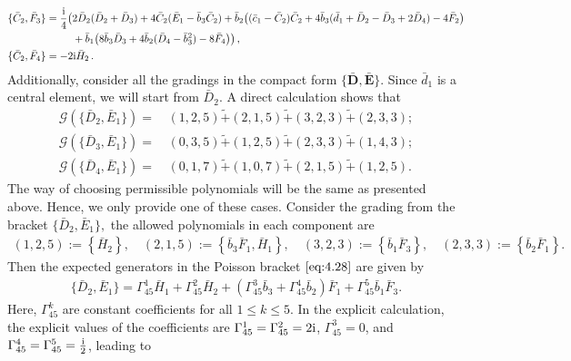 \documentclass[10pt]{amsart}
\theoremstyle{definition}
\theoremstyle{corollary}
\theoremstyle{remark}
\theoremstyle{conclusion}
\begin{document}
\begin{align} 
\{\bar{C}_2, \bar{F}_{3}\}&=\frac{{\rm i}}{4}\bigl( 2\bar{D}_2(\bar{D}_2+\bar{D}_3)+4 \bar{C}_2(\bar{E}_1-\bar{b}_3 \bar{C}_2)+\bar{b}_2\bigl((\bar{c}_1-\bar{C}_2)\bar{C}_2+4 \bar{b}_3(\bar{d}_1+\bar{D}_2-\bar{D}_3+2 \bar{D}_4)-4 \bar{F}_2 \bigl)  \nonumber\\
& \hskip 0.9 cm  +\bar{b}_1\bigl(8 \bar{b}_3 \bar{D}_3+4 \bar{b}_2(\bar{D}_4-\bar{b}_3^2)-8 \bar{F}_4\bigl)\bigl) \, , \nonumber\\
\{\bar{C}_2, \bar{F}_{4}\}&=-2 {\rm i} \bar{H}_2 \, .
\end{align} 
 Additionally, consider all the gradings in the compact form $\{\bar{\textbf{D}},\bar{\textbf{E}}\}$. Since $\bar{d}_1$ is a central element, we will start from $\bar{D}_2.$ A direct calculation shows that \begin{align}
    \mathcal{G} (\{\bar{D}_2,\bar{E}_1\}) = & \, (1,2,5) \tilde{+} (2,1,5) \tilde{+} (3,2,3) \tilde{+} (2,3,3); \label{eq:4.28}\\
    \mathcal{G} (\{\bar{D}_3,\bar{E}_1\}) = & \, (0,3,5) \tilde{+} (1,2,5) \tilde{+} (2,3,3) \tilde{+} (1,4,3) ; \label{eq:4.29}\\ 
   \mathcal{G} (\{\bar{D}_4,\bar{E}_1\}) = & \, (0,1,7) \tilde{+} (1,0,7) \tilde{+} (2,1,5) \tilde{+} (1,2,5).  \label{eq:4.30}
\end{align} The way of choosing permissible polynomials will be the same as presented above. Hence, we only provide one of these cases. Consider the grading from the bracket $\{\bar{D}_2,\bar{E}_1\},$ the allowed polynomials in each component are \begin{align}
    (1,2,5) :=   \left\{\bar{H}_2\right\}, \quad   (2,1,5) :=  \left\{\bar{b}_3\bar{F}_1,\bar{H}_1\right\}, \quad    (3,2,3) :=  \left\{\bar{b}_1\bar{F}_3\right\}  , \quad    (2,3,3):=  \left\{\bar{b}_2\bar{F}_1\right\}. \label{eq:gend2e1}
\end{align} Then the expected generators in the Poisson bracket $\eqref{eq:4.28}$ are given by 
\begin{align*}
    \{\bar{D}_2,\bar{E}_1\} =\Gamma_{45}^1 \bar{H}_1 + \Gamma_{45}^2 \bar{H}_2 + \left(\Gamma_{45}^3\bar{b}_3  + \Gamma_{45}^{4}\bar{b}_2\right)\bar{F}_1 + \Gamma_{45}^{5}\bar{b}_1\bar{F}_3.
\end{align*} Here, $\Gamma_{45}^k$ are constant coefficients for all $1 \leq k \leq 5$.  In the explicit calculation, the explicit values of the coefficients are $\Gamma_{45}^1 = \Gamma_{45}^2 = 2 {\rm i}$, $  \Gamma_{45}^3 = 0$, and $ \Gamma_{45}^4 = \Gamma_{45}^{5}=\frac{{\rm i}}{2}$, leading to
\end{document}
